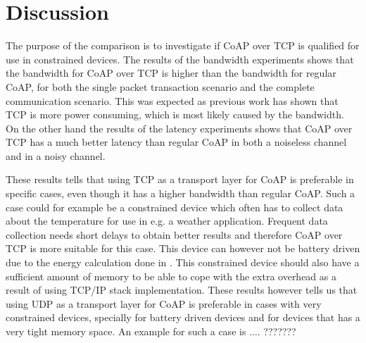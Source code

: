 \section{Discussion}
The purpose of the comparison is to investigate if CoAP over TCP is qualified for use in constrained devices. The results of the bandwidth experiments shows that the bandwidth for CoAP over TCP is higher than the bandwidth for regular CoAP, for both the single packet transaction scenario and the complete communication scenario. This was expected as previous work has shown that TCP is more power consuming, which is most likely caused by the bandwidth.
On the other hand the results of the latency experiments shows that CoAP over TCP has a much better latency than regular CoAP in both a noiseless channel and in a noisy channel. 


These results tells that using TCP as a transport layer for CoAP  is preferable in specific cases, even though it has a higher bandwidth than regular CoAP. 
Such a case could for example be a constrained device which often has to collect data about the temperature for use in e.g. a weather application. Frequent data collection needs short delays to obtain better results and therefore CoAP over TCP is more suitable for this case. This device can however not be battery driven due to the energy calculation done in \cite{dz}. This constrained device should also have a sufficient amount of memory to be able to cope with the extra overhead as a result of using TCP/IP stack implementation. 
These results however tells us that using UDP as a transport layer for CoAP is preferable in cases with very constrained devices, specially for battery driven devices and for devices that has a very tight memory space. An example for such a case is .... ??????? 



%
%

	



